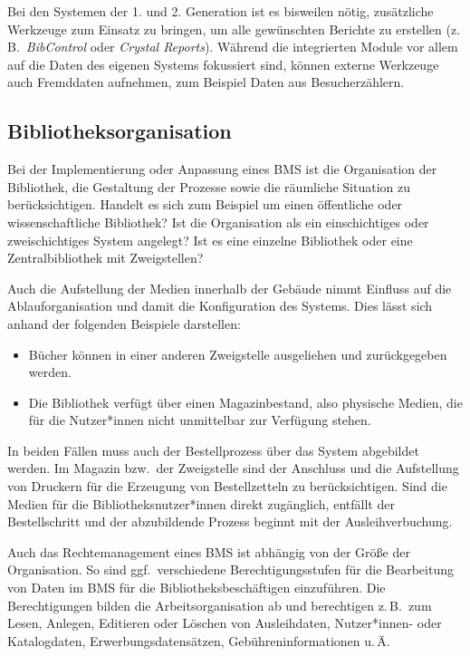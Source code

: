 \documentclass[
  11pt,
  letterpaper,
  DIV=11,
  twoside]{scrreprt}
\begin{document}
Bei den Systemen der 1. und 2. Generation ist es bisweilen nötig,
zusätzliche Werkzeuge zum Einsatz zu bringen, um alle gewünschten
Berichte zu erstellen (z.\,B.~\emph{BibControl} oder \emph{Crystal
Reports}). Während die integrierten Module vor allem auf die Daten des
eigenen Systems fokussiert sind, können externe Werkzeuge auch
Fremddaten aufnehmen, zum Beispiel Daten aus Besucherzählern.

\subsection{Bibliotheksorganisation}\label{bibliotheksorganisation}

Bei der Implementierung oder Anpassung eines BMS ist die Organisation
der Bibliothek, die Gestaltung der Prozesse sowie die räumliche
Situation zu berücksichtigen. Handelt es sich zum Beispiel um einen
öffentliche oder wissenschaftliche Bibliothek? Ist die Organisation als
ein einschichtiges oder zweischichtiges System angelegt? Ist es eine
einzelne Bibliothek oder eine Zentralbibliothek mit Zweigstellen?

Auch die Aufstellung der Medien innerhalb der Gebäude nimmt Einfluss auf
die Ablauforganisation und damit die Konfiguration des Systems. Dies
lässt sich anhand der folgenden Beispiele darstellen:

\begin{itemize}
\item
  Bücher können in einer anderen Zweigstelle ausgeliehen und
  zurückgegeben werden.
\item
  Die Bibliothek verfügt über einen Magazinbestand, also physische
  Medien, die für die Nutzer*innen nicht unmittelbar zur Verfügung
  stehen.
\end{itemize}

In beiden Fällen muss auch der Bestellprozess über das System abgebildet
werden. Im Magazin bzw.~der Zweigstelle sind der Anschluss und die
Aufstellung von Druckern für die Erzeugung von Bestellzetteln zu
berücksichtigen. Sind die Medien für die Bibliotheksnutzer*innen direkt
zugänglich, entfällt der Bestellschritt und der abzubildende Prozess
beginnt mit der Ausleihverbuchung.

Auch das Rechtemanagement eines BMS ist abhängig von der Größe der
Organisation. So sind ggf.~verschiedene Berechtigungsstufen für die
Bearbeitung von Daten im BMS für die Bibliotheksbeschäftigen
einzuführen. Die Berechtigungen bilden die Arbeitsorganisation ab und
berechtigen z.\,B.~zum Lesen, Anlegen, Editieren oder Löschen von
Ausleihdaten, Nutzer*innen- oder Katalogdaten, Erwerbungsdatensätzen,
Gebühreninformationen u.\,Ä.
\end{document}
